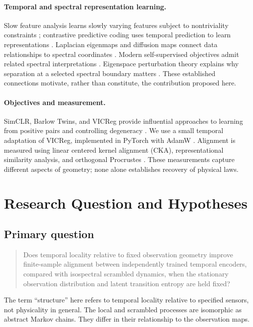 \documentclass[11pt,a4paper]{article}
\begin{document}
\paragraph{Temporal and spectral representation learning.}
Slow feature analysis learns slowly varying features subject to nontriviality constraints \citep{wiskott2002}; contrastive predictive coding uses temporal prediction to learn representations \citep{oord2018}. Laplacian eigenmaps and diffusion maps connect data relationships to spectral coordinates \citep{belkin2003,coifman2006}. Modern self-supervised objectives admit related spectral interpretations \citep{haochen2021,balestriero2022}. Eigenspace perturbation theory explains why separation at a selected spectral boundary matters \citep{yu2015}. These established connections motivate, rather than constitute, the contribution proposed here.

\paragraph{Objectives and measurement.}
SimCLR, Barlow Twins, and VICReg provide influential approaches to learning from positive pairs and controlling degeneracy \citep{chen2020,zbontar2021,bardes2022}. We use a small temporal adaptation of VICReg, implemented in PyTorch \citep{paszke2019} with AdamW \citep{loshchilov2019}. Alignment is measured using linear centered kernel alignment (CKA), representational similarity analysis, and orthogonal Procrustes \citep{kornblith2019,kriegeskorte2008,schonemann1966}. These measurements capture different aspects of geometry; none alone establishes recovery of physical laws.

\section{Research Question and Hypotheses}
\subsection{Primary question}
\begin{quote}
Does temporal locality relative to fixed observation geometry improve finite-sample alignment between independently trained temporal encoders, compared with isospectral scrambled dynamics, when the stationary observation distribution and latent transition entropy are held fixed?
\end{quote}
The term ``structure'' here refers to temporal locality relative to specified sensors, not physicality in general. The local and scrambled processes are isomorphic as abstract Markov chains. They differ in their relationship to the observation maps.
\end{document}
